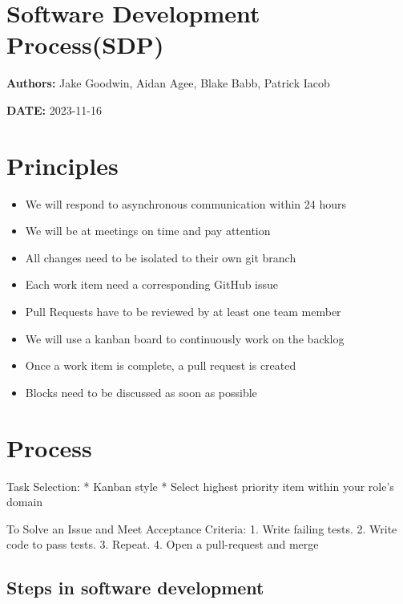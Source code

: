 \hypertarget{software-development-processsdp}{%
\section{Software Development
Process(SDP)}\label{software-development-processsdp}}

\textbf{Authors:} Jake Goodwin, Aidan Agee, Blake Babb, Patrick Iacob

\textbf{DATE:} 2023-11-16

\hypertarget{principles}{%
\section{Principles}\label{principles}}

\begin{itemize}
\tightlist
\item
  We will respond to asynchronous communication within 24 hours
\item
  We will be at meetings on time and pay attention
\item
  All changes need to be isolated to their own git branch
\item
  Each work item need a corresponding GitHub issue
\item
  Pull Requests have to be reviewed by at least one team member
\item
  We will use a kanban board to continuously work on the backlog
\item
  Once a work item is complete, a pull request is created
\item
  Blocks need to be discussed as soon as possible
\end{itemize}

\hypertarget{process}{%
\section{Process}\label{process}}

Task Selection: * Kanban style * Select highest priority item within
your role's domain

To Solve an Issue and Meet Acceptance Criteria: 1. Write failing tests.
2. Write code to pass tests. 3. Repeat. 4. Open a pull-request and merge

\hypertarget{steps-in-software-development}{%
\subsection{Steps in software
development}\label{steps-in-software-development}}

